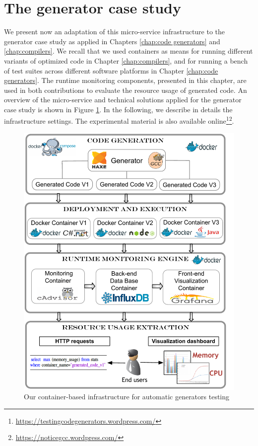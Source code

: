 \section{The generator case study}
\label{mon:case study}
We present now an adaptation of this micro-service infrastructure to the generator case study as applied in Chapters \ref{chap:code generators} and \ref{chap:compilers}. We recall that we used containers as means for running different variants of optimized code in Chapter \ref{chap:compilers}, and for running a bench of test suites across different software platforms in Chapter \ref{chap:code generators}. 
The runtime monitoring components, presented in this chapter, are used in both contributions to evaluate the resource usage of generated code. 
An overview of the micro-service and technical solutions applied for the generator case study is shown in Figure \ref{mon:infra}. In the following, we describe in details the infrastructure settings. The experimental material is also available online\footnote{\url{https://testingcodegenerators.wordpress.com/}}\footnote{\url{https://noticegcc.wordpress.com/}}.

\begin{figure}[h]
	\centering
	\includegraphics[width=0.73\linewidth]{chapitre5/fig/infra_summary}
	\caption{Our container-based infrastructure for automatic generators testing}
	\label{mon:infra}
\end{figure}


